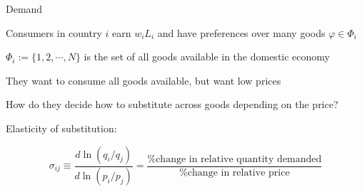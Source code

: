 \documentclass[notes,11pt, aspectratio=169, xcolor=table]{beamer}
\newenvironment{wideitemize}{\itemize\addtolength{\itemsep}{10pt}}{\enditemize}
\begin{document}
\begin{frame}{Demand}
    \begin{wideitemize}
        \item Consumers in country $i$ earn $w_iL_i$ and have preferences over many goods $\varphi \in \Phi_i$ 
        \item<2-> $\Phi_i := \{1,2,\cdots, N\}$ is the set of all goods available in the domestic economy
        \item<3-> They want to consume all goods available, but want low prices

        \item<4-> How do they decide how to substitute across goods depending on the price?

        \item<5-> Elasticity of substitution:

        \begin{equation*}
            \sigma_{ij} \equiv \frac{d \ln (q_i/q_j)}{d \ln (p_i/p_j)} = \frac{\text{\% change in relative quantity demanded}}{\text{\% change in relative price}}
        \end{equation*}

    \end{wideitemize}    
\end{frame}
\end{document}
